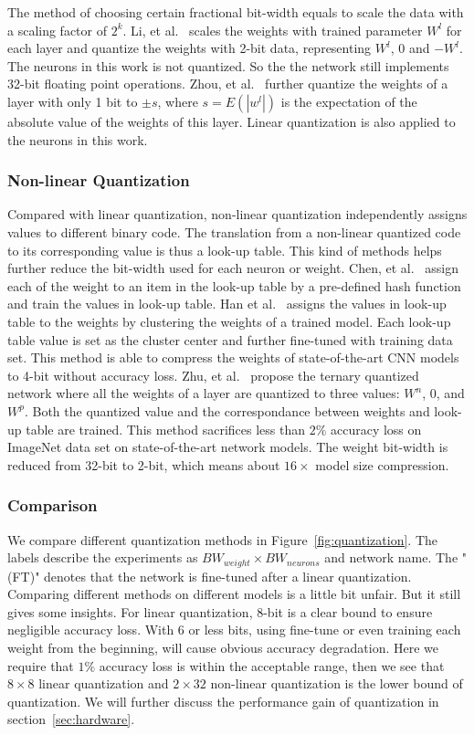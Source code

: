 The method of choosing certain fractional bit-width equals to scale the data with a scaling factor of $2^k$. Li, et al.~\cite{li2016ternary} scales the weights with trained parameter $W^l$ for each layer and quantize the weights with 2-bit data, representing $W^l$, 0 and $-W^l$. The neurons in this work is not quantized. So the the network still implements 32-bit floating point operations. Zhou, et al.~\cite{zhou2016dorefa} further quantize the weights of a layer with only 1 bit to $\pm s$, where $s=E(|w^l|)$ is the expectation of the absolute value of the weights of this layer. Linear quantization is also applied to the neurons in this work.

\subsubsection{Non-linear Quantization}
Compared with linear quantization, non-linear quantization independently assigns values to different binary code. The translation from a non-linear quantized code to its corresponding value is thus a look-up table. This kind of methods helps further reduce the bit-width used for each neuron or weight. Chen, et al.~\cite{chen2015compressing} assign each of the weight to an item in the look-up table by a pre-defined hash function and train the values in look-up table. Han et al.~\cite{han2015deep} assigns the values in look-up table to the weights by clustering the weights of a trained model. Each look-up table value is set as the cluster center and further fine-tuned with training data set. This method is able to compress the weights of state-of-the-art CNN models to 4-bit without accuracy loss. Zhu, et al.~\cite{zhu2016trained} propose the ternary quantized network where all the weights of a layer are quantized to three values: $W^n$, 0, and $W^p$. Both the quantized value and the correspondance between weights and look-up table are trained. This method sacrifices less than $2\%$ accuracy loss on ImageNet data set on state-of-the-art network models. The weight bit-width is reduced from 32-bit to 2-bit, which means about $16\times$ model size compression.

\subsubsection{Comparison}
We compare different quantization methods in Figure~\ref{fig:quantization}. The labels describe the experiments as $BW_{weight}\times BW_{neurons}$ and network name. The "(FT)" denotes that the network is fine-tuned after a linear quantization. Comparing different methods on different models is a little bit unfair. But it still gives some insights. For linear quantization, 8-bit is a clear bound to ensure negligible accuracy loss. With 6 or less bits, using fine-tune or even training each weight from the beginning, will cause obvious accuracy degradation. Here we require that $1\%$ accuracy loss is within the acceptable range, then we see that $8\times8$ linear quantization and $2\times32$ non-linear quantization is the lower bound of quantization. We will further discuss the performance gain of quantization in section~\ref{sec:hardware}. 

